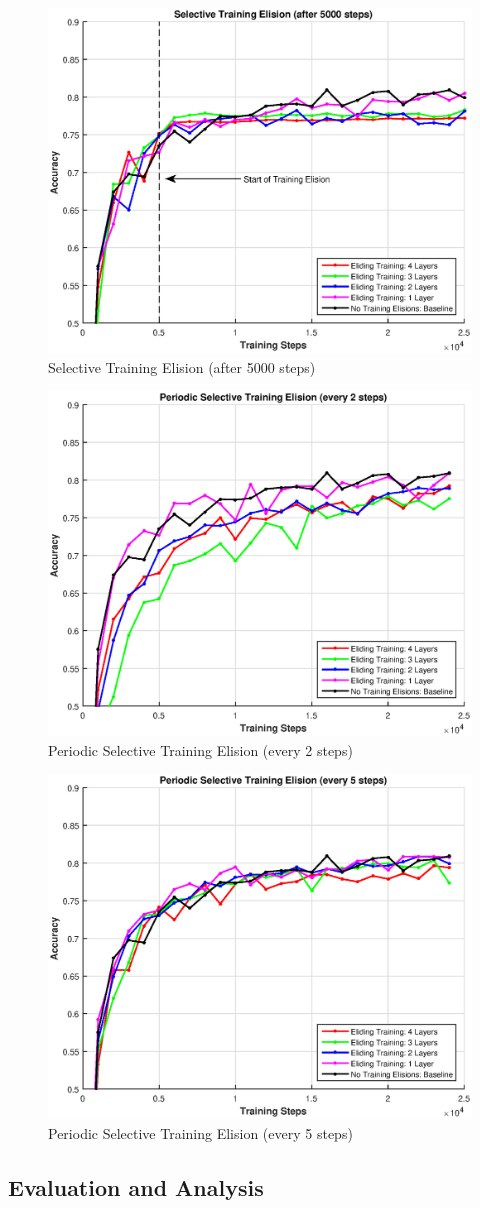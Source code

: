\begin{figure}[t]
	\centering
	\includegraphics[width=0.8\columnwidth]{figures/approx.eps}
	\caption{Selective Training Elision (after 5000 steps)}
	\label{fig:approx}
\end{figure}
\begin{figure}[t]
	\centering
	\includegraphics[width=0.8\columnwidth]{figures/periodic-approx-2.eps}
	\caption{Periodic Selective Training Elision (every 2 steps)}
	\label{fig:periodic-approx-2}
\end{figure}
\begin{figure}[t]
	\centering
	\includegraphics[width=0.8\columnwidth]{figures/periodic-approx-5.eps}
	\caption{Periodic Selective Training Elision (every 5 steps)}
	\label{fig:periodic-approx-5}
\end{figure}
\subsection{Evaluation and Analysis}
